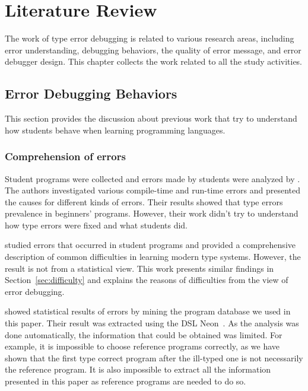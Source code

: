 \documentclass[12pt]{report}	%
\begin{document}
\chapter{Literature Review}
\label{sec:review}

The work of type error debugging is related to various research areas, including
error understanding, debugging behaviors, the quality of error message,
and error debugger design.
This chapter collects the work related to all the study activities.

\section{Error Debugging Behaviors}
\label{sec:review:behavior}

This section provides the discussion about previous work that try to understand how students behave when learning programming languages.

\subsection{Comprehension of errors}

Student programs were collected and errors made by students
were analyzed by \cite{tirronen2015understanding}.
The authors investigated various compile-time and run-time errors
and presented the causes for different kinds of errors.
Their results showed that type errors prevalence in beginners' programs.
However, their work didn't try to understand how type
errors were fixed and what students did.

\cite{tirronen2014study} studied
errors that occurred in student programs and
provided a comprehensive description of
common difficulties in learning modern type systems.
However, the result is not from a statistical view.
This work presents similar findings in Section~\ref{sec:difficulty}
and explains the
reasons of difficulties from the view of error debugging.

\cite{hage2006mining} showed statistical
results of errors by mining the program database we used
in this paper.
Their result was extracted using the DSL Neon~\cite{Hage09:Neon}.
As the analysis was done automatically, the information that
could be obtained was limited. For example, it is impossible
to choose reference programs correctly, as we have shown that
the first type correct program after the ill-typed one is not
necessarily the reference program. It is also impossible to
extract all the information presented in this paper as
reference programs are needed to do so.
\end{document}
